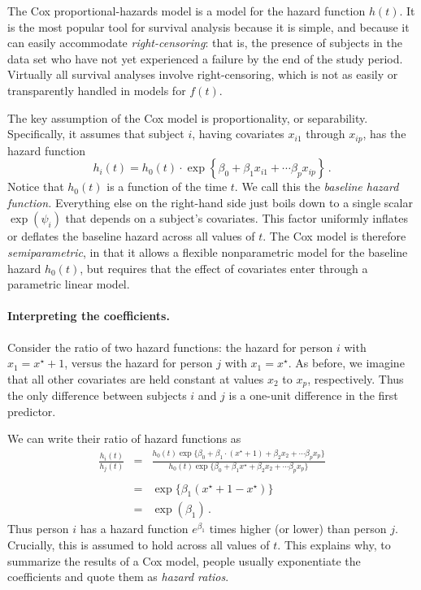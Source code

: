 \documentclass[11pt]{article}
\newcommand{\1}[1]{\mathbf{1}_{\{ {#1} \}}}
\begin{document}
The Cox proportional-hazards model is a model for the hazard function $h(t)$.  It is the most popular tool for survival analysis because it is simple, and because it can easily accommodate \textit{right-censoring}: that is, the presence of subjects in the data set who have not yet experienced a failure by the end of the study period.  Virtually all survival analyses involve right-censoring, which is not as easily or transparently handled in models for $f(t)$.

The key assumption of the Cox model is proportionality, or separability.  Specifically, it assumes that subject $i$, having covariates $x_{i1}$ through $x_{ip}$, has the hazard function
$$
h_i(t) = h_0(t) \cdot \exp \left\{ \beta_0 + \beta_1 x_{i1} + \cdots \beta_p x_{ip} \right\} \, .
$$
Notice that $h_0(t)$ is a function of the time $t$.  We call this the \textit{baseline hazard function.}  Everything else on the right-hand side just boils down to a single scalar $\exp (\psi_i) $ that depends on a subject's covariates.  This factor uniformly inflates or deflates the baseline hazard across all values of $t$.  The Cox model is therefore \textit{semiparametric}, in that it allows a flexible nonparametric model for the baseline hazard $h_0(t)$, but requires that the effect of covariates enter through a parametric linear model.

\paragraph{Interpreting the coefficients.}

Consider the ratio of two hazard functions: the hazard for person $i$ with $x_1 = x^{\star} + 1$, versus the hazard for person $j$ with $x_1 = x^{\star}$.  As before, we imagine that all other covariates are held constant at values $x_2$ to $x_p$, respectively.  Thus the only difference between subjects $i$ and $j$ is a one-unit difference in the first predictor.

We can write their ratio of hazard functions as
\begin{eqnarray*}
\frac{h_i(t)}{h_j(t)} &=& \frac{ h_0(t) \exp\{ \beta_0 + \beta_1 \cdot (x^{\star} + 1) + \beta_2 x_2 + \cdots \beta_p x_p \} } {h_0(t)  \exp\{ \beta_0 + \beta_1 x^\star + \beta_2 x_2 + \cdots \beta_p x_p \} } \\
\\
&=& \exp\{ \beta_1 (x^{\star} + 1 - x^\star) \} \\
&=& \exp (\beta_1) \, .
\end{eqnarray*}
Thus person $i$ has a hazard function $e^{\beta_1}$ times higher (or lower) than person $j$.  Crucially, this is assumed to hold across all values of $t$.  This explains why, to summarize the results of a Cox model, people usually exponentiate the coefficients and quote them as \textit{hazard ratios}.
\end{document}

